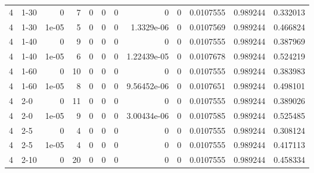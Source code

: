 \begin{tabular}{rlrrrrrrrrrr}
     4 & 1-30   &      0     &           7 &                 0 &                 0 &     0           &     0           &      0           &        0.0107555 &               0.989244 &           0.332013 \\
     4 & 1-30   &      1e-05 &           5 &                 0 &                 0 &     0           &     1.3329e-06  &      0           &        0.0107569 &               0.989244 &           0.466824 \\
     4 & 1-40   &      0     &           9 &                 0 &                 0 &     0           &     0           &      0           &        0.0107555 &               0.989244 &           0.387969 \\
     4 & 1-40   &      1e-05 &           6 &                 0 &                 0 &     0           &     1.22439e-05 &      0           &        0.0107678 &               0.989244 &           0.524219 \\
     4 & 1-60   &      0     &          10 &                 0 &                 0 &     0           &     0           &      0           &        0.0107555 &               0.989244 &           0.383983 \\
     4 & 1-60   &      1e-05 &           8 &                 0 &                 0 &     0           &     9.56452e-06 &      0           &        0.0107651 &               0.989244 &           0.498101 \\
     4 & 2-0    &      0     &          11 &                 0 &                 0 &     0           &     0           &      0           &        0.0107555 &               0.989244 &           0.389026 \\
     4 & 2-0    &      1e-05 &           9 &                 0 &                 0 &     0           &     3.00434e-06 &      0           &        0.0107585 &               0.989244 &           0.525485 \\
     4 & 2-5    &      0     &           4 &                 0 &                 0 &     0           &     0           &      0           &        0.0107555 &               0.989244 &           0.308124 \\
     4 & 2-5    &      1e-05 &           4 &                 0 &                 0 &     0           &     0           &      0           &        0.0107555 &               0.989244 &           0.417113 \\
     4 & 2-10   &      0     &          20 &                 0 &                 0 &     0           &     0           &      0           &        0.0107555 &               0.989244 &           0.458334 \\

\end{tabular}
